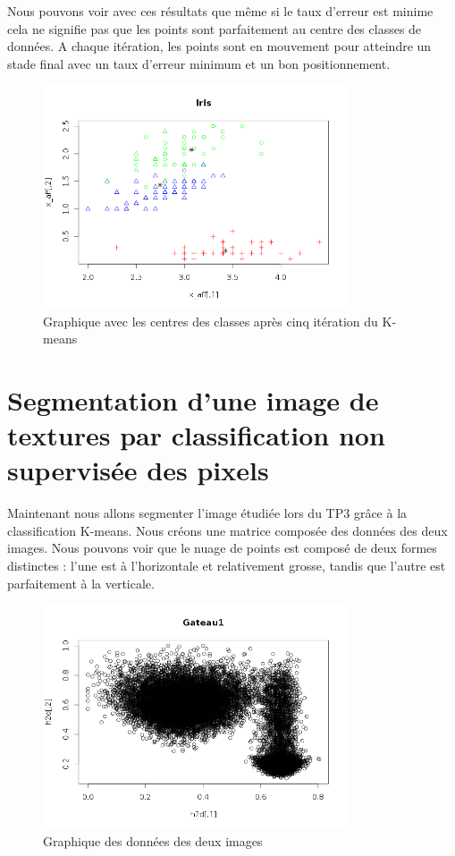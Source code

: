 \documentclass[a4paper,11pt]{article}
\begin{document}
  Nous pouvons voir avec ces résultats que même si le taux d'erreur est minime cela ne signifie pas
  que les points sont parfaitement au centre des classes de données. A chaque itération, les points
  sont en mouvement pour atteindre un stade final avec un taux d'erreur minimum et un bon positionnement.
  \begin{figure}[H]
    \center
    \includegraphics[width=9cm]{resultat/5_ite.png}
    \caption{Graphique avec les centres des classes après cinq itération du K-means}
  \end{figure}
  
  
  \section{Segmentation d'une image de textures par classification non supervisée des pixels}
  Maintenant nous allons segmenter l'image étudiée lors du TP3 grâce à la classification
  K-means. Nous créons une matrice composée des données des deux images. Nous pouvons voir que le nuage
  de points est composé de deux formes distinctes : l'une est à l'horizontale et relativement grosse, tandis 
  que l'autre est parfaitement à la verticale.
  
  \begin{figure}[H]
    \center
    \includegraphics[width=9cm]{resultat/image_combine.png}
    \caption{Graphique des données des deux images}
  \end{figure}
  
\end{document}
